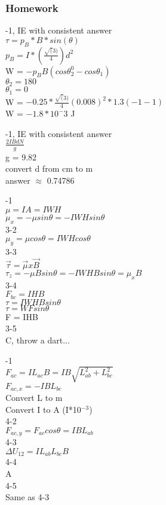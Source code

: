 \documentclass{article}
\begin{document}
\subsubsection{Homework}

-1, IE with consistent answer \\
$\tau = p_B * B * sin(\theta)$ \\
$p_B = I * (\frac{\sqrt(3)}{4})d^2$ \\
W = $-p_B B (cos\theta_2^0 - cos\theta_1)$ \\
$\theta_2 = 180$ \\
$\theta_1 = 0$ \\
W = $-0.25 * \frac{\sqrt(3)}{4}(0.008)^2 * 1.3 (-1-1)$ \\
W = $-1.8*10^-3$ J


\vspace{2mm}

-1, IE with consistent answer \\
$\frac{2 I B d N}{g}$ \\
g = 9.82 \\
convert d from cm to m \\
answer $\approx$ 0.74786

\vspace{2mm}

-1 \\
$\mu = IA = IWH $ \\
$\mu_x = -\mu sin \theta = -IWH sin \theta$ \\
3-2 \\
$\mu_y = \mu cos \theta = IWH cos \theta$ \\
3-3 \\
$\vec{\tau} = \vec{\mu} x \vec{B}$ \\
$\tau_z = -\mu B sin \theta = -IWHB sin \theta = \mu_x B$ \\
3-4 \\
$F_{bc} = IHB $ \\
$\tau = IWHB sin \theta $ \\
$\tau = WF sin \theta $ \\
F = IHB \\
3-5 \\
C, throw a dart...

\vspace{2mm}

-1 \\
$F_{ac} = IL_{ac}B = IB \sqrt{L_{ab}^2 + L_{bc}^2}$ \\
$F_{ac,x} = -IBL_{bc}$ \\
Convert L to m \\
Convert I to A (I*10$^{-3}$) \\
4-2 \\
$F_{ac,y} = F_{ac}cos \theta = IBL_{ab}$\\
4-3 \\
$\Delta U_{12} = I L_{ab} L_{bc} B$ \\
4-4 \\
A \\
4-5 \\
Same as 4-3
\end{document}
